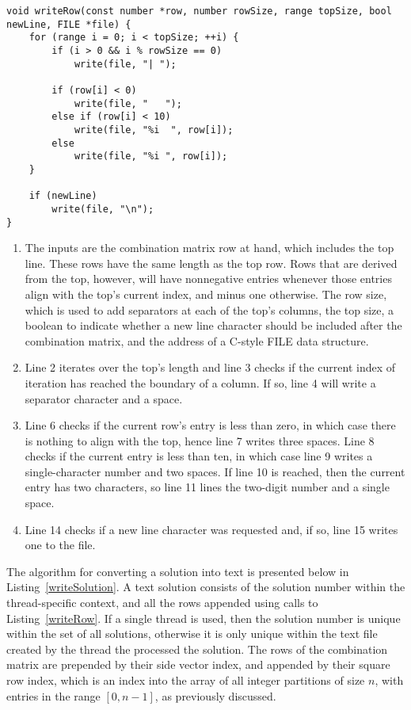 \begin{lstlisting}[caption={Writing a single row from a combination matrix.},label={writeRow}]
void writeRow(const number *row, number rowSize, range topSize, bool newLine, FILE *file) {
    for (range i = 0; i < topSize; ++i) {
        if (i > 0 && i % rowSize == 0)
            write(file, "| ");

        if (row[i] < 0)
            write(file, "   ");
        else if (row[i] < 10)
            write(file, "%i  ", row[i]);
        else
            write(file, "%i ", row[i]);
    }

    if (newLine)
        write(file, "\n");
}
\end{lstlisting}

\begin{enumerate}
\item The inputs are the combination matrix row at hand, which includes the top line. These rows have the same length as the top row. Rows that are derived from the top, however, will have nonnegative entries whenever those entries align with the top's current index, and minus one otherwise. The row size, which is used to add separators at each of the top's columns, the top size, a boolean to indicate whether a new line character should be included after the combination matrix, and the address of a C-style FILE data structure.
\item Line 2 iterates over the top's length and line 3 checks if the current index of iteration has reached the boundary of a column. If so, line 4 will write a separator character and a space.
\addtocounter{enumi}{3}
\item Line 6 checks if the current row's entry is less than zero, in which case there is nothing to align with the top, hence line 7 writes three spaces. Line 8 checks if the current entry is less than ten, in which case line 9 writes a single-character number and two spaces. If line 10 is reached, then the current entry has two characters, so line 11 lines the two-digit number and a single space.
\addtocounter{enumi}{7}
\item Line 14 checks if a new line character was requested and, if so, line 15 writes one to the file.
\end{enumerate}

The algorithm for converting a solution into text is presented below in Listing~\ref{writeSolution}. A text solution consists of the solution number within the thread-specific context, and all the rows appended using calls to Listing~\ref{writeRow}. If a single thread is used, then the solution number is unique within the set of all solutions, otherwise it is only unique within the text file created by the thread the processed the solution. The rows of the combination matrix are prepended by their side vector index, and appended by their square row index, which is an index into the array of all integer partitions of size $n$, with entries in the range $[0, n - 1]$, as previously discussed.

